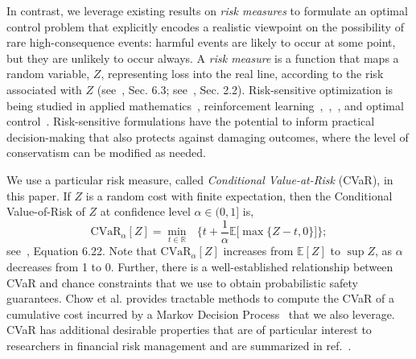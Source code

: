 \documentclass[letterpaper, 10 pt, conference]{ieeeconf}  %
\begin{document}
In contrast, we leverage existing results on \textit{risk measures} to formulate an optimal control problem
that explicitly encodes a realistic viewpoint on the possibility of rare high-consequence events: 
harmful events are likely to occur at some point, but they are unlikely to occur always.
A \textit{risk measure} is a function that maps a random variable, $Z$, representing loss into the real line,
according to the risk associated with $Z$ (see~\cite{shapiro2009lectures}, Sec. 6.3; see~\cite{kisiala2015conditional}, Sec. 2.2).
Risk-sensitive optimization
is being studied in applied mathematics~\cite{ruszczynski2010risk}, reinforcement learning~\cite{osogami2012robustness},~\cite{chow2015risk},~\cite{ratliff2017risk}, and optimal control~\cite{chow2014framework}.\footnotemark
{} 
Risk-sensitive formulations have the potential to inform practical decision-making that also protects against damaging outcomes, where the level of conservatism can be modified as needed.

We use a particular risk measure, called \textit{Conditional Value-at-Risk} (CVaR), in this paper.
If $Z$ is a random cost with finite expectation, then the Conditional Value-of-Risk of $Z$ at confidence level $\alpha \in (0,1]$
is, 
\begin{equation}
\text{CVaR}_\alpha[Z] = {\underset{t \in \mathbb{R}}\min} \text{ }\Big\{ t + \frac{1}{\alpha}\mathbb{E}\big[\max\{Z-t,0\}\big] \Big\};
\label{cvareqn}
\end{equation}
see~\cite{shapiro2009lectures}, Equation 6.22.\footnotemark
{}
Note that $\text{CVaR}_\alpha[Z]$ increases from $\mathbb{E}[Z]$ to $\sup Z$, as $\alpha$ decreases from 1 to 0.\footnotemark
{}
Further, there is a well-established relationship between CVaR and chance constraints
that we use to obtain probabilistic safety guarantees. 
Chow et al. provides tractable methods to compute the CVaR of a cumulative cost
incurred by a Markov Decision Process~\cite{chow2015risk} that we also leverage.
CVaR has additional desirable properties that are of particular interest to researchers in financial risk management and are summarized in ref.~\cite{serraino2013conditional}. 
\end{document}
